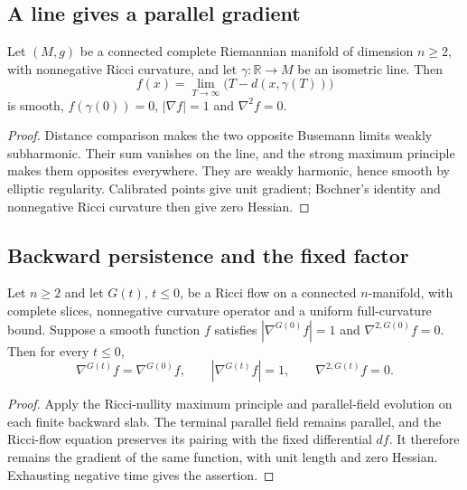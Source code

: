 \subsection{A line gives a parallel gradient}

\begin{lemma}
\label{lem:ancient-line-busemann}
Let $(M,g)$ be a connected complete Riemannian manifold of
dimension $n\geq2$, with nonnegative Ricci curvature, and let
$\gamma:\mathbb R\to M$ be an isometric line.  Then
\[
 f(x)=\lim_{T\to\infty}\bigl(T-d(x,\gamma(T))\bigr)
\]
is smooth, $f(\gamma(0))=0$, $|\nabla f|=1$ and $\nabla^2f=0$.
\end{lemma}
\begin{proof}
Distance comparison makes the two opposite Busemann limits weakly subharmonic.
Their sum vanishes on the line, and the strong maximum principle makes them
opposites everywhere. They are weakly harmonic, hence smooth by elliptic
regularity. Calibrated points give unit gradient; Bochner's identity and
nonnegative Ricci curvature then give zero Hessian.
\end{proof}

\subsection{Backward persistence and the fixed factor}

\begin{lemma}
\label{lem:ancient-parallel-persistence}
Let $n\geq2$ and let $G(t)$, $t\leq0$, be a Ricci flow on a connected $n$-manifold,
with complete slices, nonnegative curvature operator and a uniform
full-curvature bound.  Suppose a smooth function $f$ satisfies
$|\nabla^{G(0)}f|=1$ and $\nabla^{2,G(0)}f=0$.
Then for every $t\leq0$,
\[
 \nabla^{G(t)}f=\nabla^{G(0)}f,\qquad
 |\nabla^{G(t)}f|=1,\qquad \nabla^{2,G(t)}f=0.
\]
\end{lemma}
\begin{proof}
Apply the Ricci-nullity maximum principle and parallel-field evolution on each
finite backward slab. The terminal parallel field remains parallel, and the
Ricci-flow equation preserves its pairing with the fixed differential $df$. It
therefore remains the gradient of the same function, with unit length and zero
Hessian. Exhausting negative time gives the assertion.
\end{proof}

